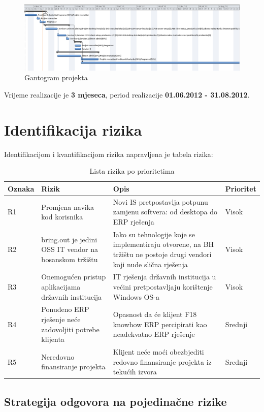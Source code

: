 \documentclass[times, utf8, seminar]{fit}
\begin{document}
\begin{figure}[!h]
\centering
\includegraphics[width=15.5cm]{img/dinamika_gant.png}
\caption{Gantogram projekta}
\end{figure}

Vrijeme realizacije je \textbf{3 mjeseca}, period realizacije \textbf{01.06.2012 - 31.08.2012}.
\section{Identifikacija rizika}
Identifikacijom i kvantifikacijom rizika napravljena je tabela rizika:
\begin{table}[!h]
\centering
\begin{tabular}{ |p{1.5cm}|p{4cm}|p{7.5cm}|p{1.5cm}| }
\hline
Oznaka & Rizik & Opis & Prioritet  \\ \hline\hline
R1 & Promjena navika kod korisnika & Novi IS pretpostavlja potpunu zamjenu softvera: od desktopa do ERP rješenja & Visok \\ \hline
R2 & bring.out je jedini OSS IT vendor na bosanskom tržištu & Iako su tehnologije koje se implementiraju otvorene, na BH tržištu ne postoje drugi vendori koji nude slična rješenja & Visok \\ \hline
R3 & Onemogućen pristup aplikacijama državnih institucija & IT rješenja državnih institucija u većini pretpostavljaju korištenje Windows OS-a & Visok \\ \hline
R4 & Ponuđeno ERP rješenje neće zadovoljiti potrebe klijenta & Opasnost da će klijent F18 knowhow ERP percipirati kao neadekvatno ERP rješenje & Srednji \\ \hline
R5 & Neredovno finansiranje projekta & Klijent neće moći obezbjediti redovno finansiranje projekta iz tekućih izvora & Srednji \\ \hline
\end{tabular}
\caption{Lista rizika po prioritetima}
\end{table}

\subsection{Strategija odgovora na pojedinačne rizike} 
\end{document}

